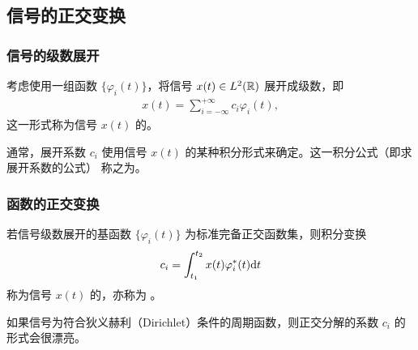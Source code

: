 \subsection{信号的正交变换}

\subsubsection{信号的级数展开}

\begin{definition}[信号的级数展开]
    考虑使用一组函数 $\{\varphi_i(t)\}$，将信号 $x(t) \in L^2(\mathbb{R})$ 展开成级数，即
    \begin{align*}
        x(t) = \sum_{i = -\infty}^{+\infty}c_i\varphi_i(t),
    \end{align*}
    这一形式称为信号 $x(t)$ 的。

    通常，展开系数 $c_i$ 使用信号 $x(t)$ 的某种积分形式来确定。这一积分公式（即求展开系数的公式）
    称之为。
\end{definition}

\subsubsection{函数的正交变换}

\begin{definition}[函数的正交变换]
    若信号级数展开的基函数 $\{\varphi_i(t)\}$ 为标准完备正交函数集，则积分变换
    \begin{align*}
        c_i = \int_{t_1}^{t_2}x(t)\varphi_i^*(t)\mathrm{d}t
    \end{align*}
    称为信号 $x(t)$ 的，亦称为 。
\end{definition}

\begin{note}
    如果信号为符合狄义赫利（Dirichlet）条件的周期函数，则正交分解的系数 $c_i$ 的形式会很漂亮。
\end{note}
